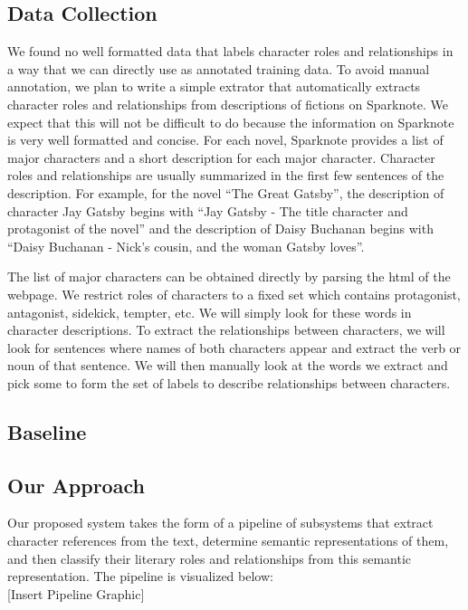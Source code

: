 \documentclass[dvips,12pt]{article}
\begin{document}
\subsection{Data Collection}
    We found no well formatted data that labels character roles and relationships in a way that we can directly use as annotated training data.
    To avoid manual annotation, we plan to write a simple extrator that automatically extracts character roles and relationships from
    descriptions of fictions on Sparknote. We expect that this will not be difficult to do because the information on Sparknote is very
    well formatted and concise. For each novel, Sparknote provides a list of major characters and a short description for each major
    character. Character roles and relationships are usually summarized in the first few sentences of the description. For example,
    for the novel ``The Great Gatsby'', the description of character Jay Gatsby begins with ``Jay Gatsby -  The title character and protagonist of the novel''
    and the description of Daisy Buchanan begins with ``Daisy Buchanan - Nick's cousin, and the woman Gatsby loves''.

    The list of major characters can be obtained directly by parsing the html of the webpage. We restrict roles of characters to a fixed set which contains
    protagonist, antagonist, sidekick, tempter, etc. We will simply look for these words in character descriptions. To extract the relationships between characters,
    we will look for sentences where names of both characters appear and extract the verb or noun of that sentence. We will then manually look at the words we extract
    and pick some to form the set of labels to describe relationships between characters.
\subsection{Baseline}

\subsection{Our Approach}
    Our proposed system takes the form of a pipeline of subsystems that extract character references from the text, determine semantic representations of them, and then classify their literary roles and relationships from this semantic representation. The pipeline is visualized below: \\

    [Insert Pipeline Graphic] \\
\end{document}

